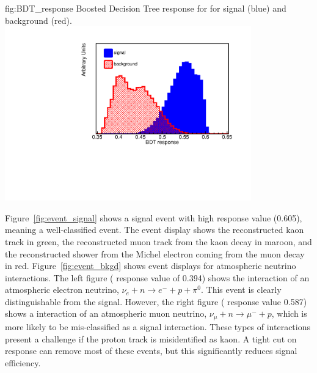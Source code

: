 \begin{dunefigure}
{fig:BDT_response}
{Boosted Decision Tree response for \ptoknubar for signal (blue) and background (red).}
\includegraphics[width=0.8\textwidth]{graphics/BDT_response.pdf}
\end{dunefigure} 

Figure~\ref{fig:event_signal} shows a signal event with high  response value (\num{0.605}), meaning a well-classified event. The event display shows the reconstructed kaon track in green, the reconstructed muon track from the kaon decay in maroon, and the reconstructed shower from the Michel electron coming from the muon decay in red. Figure~\ref{fig:event_bkgd} shows event displays for atmospheric neutrino interactions.  The left figure ( response value of \num{0.394}) shows the interaction of an atmospheric electron neutrino, $\nu_{e}+n\rightarrow e^{-}+p+\pi^{0}$.  This event is clearly distinguishable from the signal.  However, the right figure ( response value \num{0.587}) shows a  interaction of an atmospheric muon neutrino, $\nu_{\mu}+n \rightarrow \mu^{-}+p$, which is more likely to be mis-classified as a signal interaction. These types of interactions present a challenge if the proton track is misidentified as kaon. A tight cut on  response can remove most of these events, but this significantly reduces signal efficiency.


